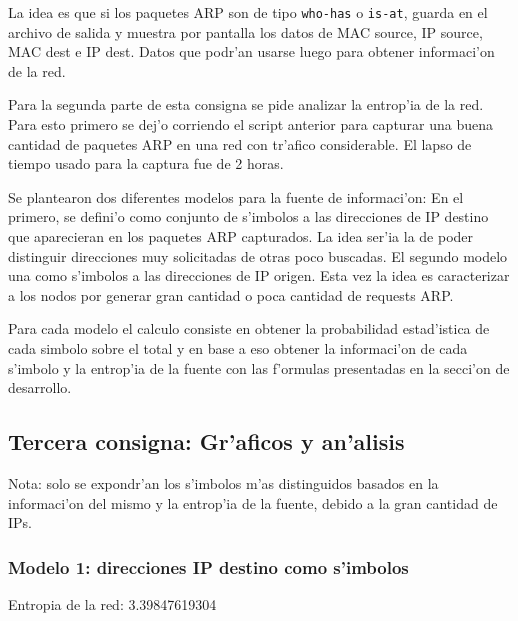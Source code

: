 \documentclass[a4paper,10pt]{article}
\begin{document}
La idea es que si los paquetes ARP son de tipo \texttt{who-has} o \texttt{is-at}, guarda en el archivo de salida y muestra por pantalla los datos de MAC source, IP source, MAC dest e IP dest. Datos que podr'an usarse luego para obtener informaci'on de la red.

\vspace*{5 mm}

Para la segunda parte de esta consigna se pide analizar la entrop'ia de la red. Para esto primero se dej'o corriendo el script anterior para capturar una buena cantidad de paquetes ARP en una red con tr'afico considerable. El lapso de tiempo usado para la captura fue de 2 horas. 

\vspace*{5 mm}

Se plantearon dos diferentes modelos para la fuente de informaci'on: En el primero, se defini'o como conjunto de s'imbolos a las direcciones de IP destino que aparecieran en los paquetes ARP capturados. La idea ser'ia la de poder distinguir direcciones muy solicitadas de otras poco buscadas. El segundo modelo una como s'imbolos a las direcciones de IP origen. Esta vez la idea es caracterizar a los nodos por generar gran cantidad o poca cantidad de requests ARP.

\vspace*{5 mm}

Para cada modelo el calculo consiste en obtener la probabilidad estad'istica de cada simbolo sobre el total y en base a eso obtener la informaci'on de cada s'imbolo y la entrop'ia de la fuente con las f'ormulas presentadas en la secci'on de desarrollo.

\subsection{Tercera consigna: Gr'aficos y an'alisis}
\label{expli1:}

Nota: solo se expondr'an los s'imbolos m'as distinguidos basados en la informaci'on del mismo y la entrop'ia de la fuente, debido a la gran cantidad de IPs. \\

\subsubsection{Modelo 1: direcciones IP destino como s'imbolos}

Entropia de la red: 3.39847619304	\\
\end{document}

